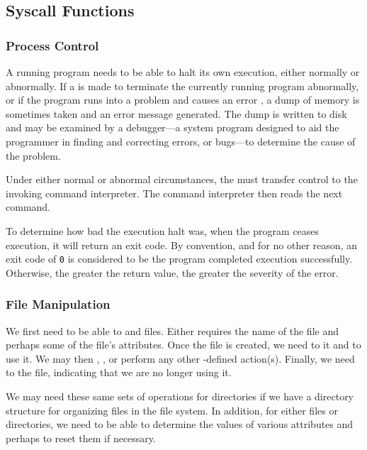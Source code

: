 \subsection{Syscall Functions}\label{subsec:Syscall_Functions}
\subsubsection{Process Control}\label{subsubsec:Process_Control}
A running program needs to be able to halt its own execution, either normally or abnormally.
If a  is made to terminate the currently running program abnormally, or if the program runs into a problem and causes an error , a dump of memory is sometimes taken and an error message generated.
The dump is written to disk and may be examined by a debugger—a system program designed to aid the programmer in finding and correcting errors, or bugs—to determine the cause of the problem.

Under either normal or abnormal circumstances, the  must transfer control to the invoking command interpreter.
The command interpreter then reads the next command.

To determine how bad the execution halt was, when the program ceases execution, it will return an exit code.
By convention, and for no other reason, an exit code of \texttt{0} is considered to be the program completed execution successfully.
Otherwise, the greater the return value, the greater the severity of the error.

\subsubsection{File Manipulation}\label{subsubsec:File_Manipulation}
We first need to be able to  and  files.
Either  requires the name of the file and perhaps some of the file’s attributes.
Once the file is created, we need to  it and to use it.
We may then , , or perform any other -defined action(s).
Finally, we need to  the file, indicating that we are no longer using it.

We may need these same sets of operations for directories if we have a directory structure for organizing files in the file system.
In addition, for either files or directories, we need to be able to determine the values of various attributes and perhaps to reset them if necessary.

